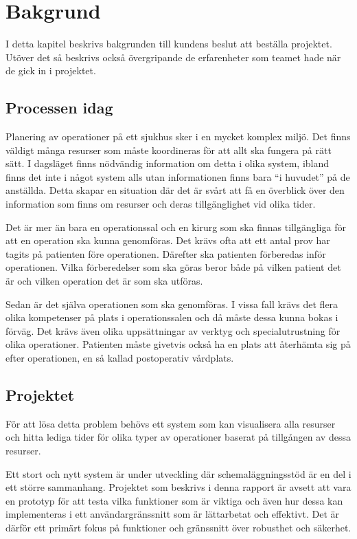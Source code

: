 \chapter{Bakgrund} \label{cha:bakgrund}
I detta kapitel beskrivs bakgrunden till kundens beslut att beställa projektet.
Utöver det så beskrivs också övergripande de erfarenheter som teamet hade när de gick
in i projektet.

\section{Processen idag}
Planering av operationer på ett sjukhus sker i en mycket komplex miljö. Det
finns väldigt många resurser som måste koordineras för att allt ska fungera på rätt sätt.
I dagsläget finns nödvändig information om detta i olika system, ibland finns
det inte i något system alls utan informationen finns bara \enquote{i huvudet} på de anställda. Detta
skapar en situation där det är svårt att få en överblick över den information som finns om 
resurser och deras tillgänglighet vid olika tider.

Det är mer än bara en operationssal och en kirurg som ska finnas tillgängliga
för att en operation ska kunna genomföras. Det krävs ofta att ett antal prov har
tagits på patienten före operationen. Därefter ska patienten
förberedas inför operationen. Vilka förberedelser som ska göras beror både på
vilken patient det är och vilken operation det är som ska utföras.

Sedan är det
själva operationen som ska genomföras. I vissa fall krävs det flera olika
kompetenser på plats i operationssalen och då måste dessa kunna bokas i förväg.
Det krävs även olika uppsättningar av verktyg och specialutrustning för olika
operationer.
Patienten måste givetvis också ha en plats att återhämta sig på efter
operationen, en så kallad postoperativ vårdplats.

\section{Projektet}
För att lösa detta problem behövs ett system som kan visualisera alla resurser
och hitta lediga tider för olika typer av operationer baserat på tillgången av
dessa resurser.

Ett stort och nytt system är under utveckling där schemaläggningsstöd är en del
i ett större sammanhang. Projektet som beskrivs i denna rapport är avsett att vara
en prototyp för att testa vilka funktioner som är viktiga och även hur dessa
kan implementeras i ett användargränssnitt som är lättarbetat och effektivt.
Det är därför ett primärt fokus på funktioner och gränssnitt över robusthet och
säkerhet.

